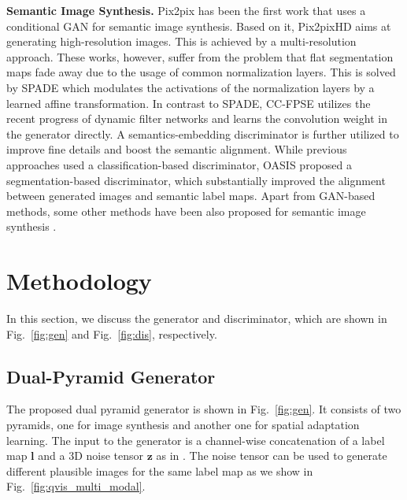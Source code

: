 \documentclass{bmvc2k}
\newcommand{\figref}[1]{Fig.~\ref{#1}}
\begin{document}
\textbf{Semantic Image Synthesis.} 
Pix2pix \cite{isola2017image} has been the first work that uses a conditional GAN \cite{mirza2014conditional} for semantic image synthesis.
Based on it, Pix2pixHD \cite{wang2018high} aims at generating high-resolution images. This is achieved by a multi-resolution approach.
These works, however, suffer from the problem that flat segmentation maps fade away due to the usage of common normalization layers.
This is solved by SPADE \cite{park2019semantic} which modulates the activations of the normalization layers by a learned affine transformation.
In contrast to SPADE, CC-FPSE \cite{liu2019learning} utilizes the recent progress of dynamic filter networks and learns the convolution weight in the generator directly. A semantics-embedding discriminator is further utilized to improve fine details and boost the semantic alignment.
While previous approaches used a classification-based discriminator, OASIS \cite{schonfeld_sushko_iclr2021} proposed a segmentation-based discriminator, which substantially improved the alignment between generated images and semantic label maps.
Apart from GAN-based methods, some other methods have been also proposed for semantic image synthesis \cite{chen2017photographic,qi2018semi,wang2018high,huang2018multimodal,jiang2020tsit,lee2018diverse}.




\begin{figure*}[t]
    \centering
    \caption{The proposed discriminator exploits supervision at different scales including a loss at patch level (left), feature level (top right), and pixel level (bottom right). }
    \label{fig:dis}
    \vspace{-5mm}
\end{figure*}

\section{Methodology}



In this section, we discuss the generator and discriminator, which are shown in \figref{fig:gen} and \figref{fig:dis}, respectively. 

\subsection{Dual-Pyramid Generator}
The proposed dual pyramid generator is shown in \figref{fig:gen}. It consists of two pyramids, one for image synthesis and another one for spatial adaptation learning. The input to the generator is a channel-wise concatenation of a label map $\mathbf{l}$ and a 3D noise tensor $\mathbf{z}$ as in \cite{schonfeld_sushko_iclr2021}. The noise tensor can be used to generate different plausible images for the same label map as we show in Fig.~\ref{fig:qvis_multi_modal}. 
\end{document}
